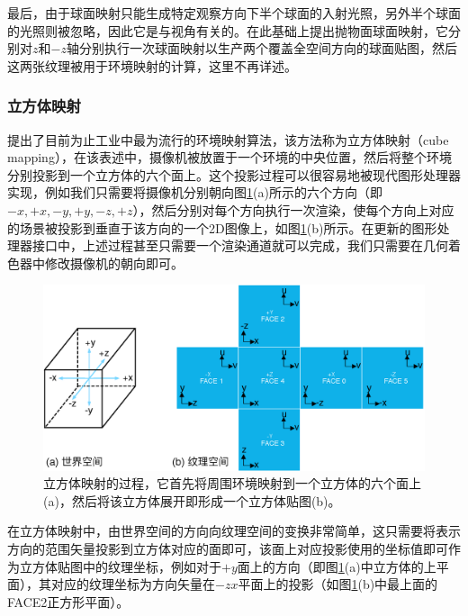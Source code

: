 最后，由于球面映射只能生成特定观察方向下半个球面的入射光照，另外半个球面的光照则被忽略，因此它是与视角有关的。\cite{a:View-independentenvironmentmaps}在此基础上提出抛物面球面映射，它分别对$z$和$-z$轴分别执行一次球面映射以生产两个覆盖全空间方向的球面贴图，然后这两张纹理被用于环境映射的计算，这里不再详述。



\subsubsection{立方体映射}
\cite{a:EnvironmentMappingandOtherApplicationsofWorldProjections}提出了目前为止工业中最为流行的环境映射算法，该方法称为立方体映射（cube mapping），在该表述中，摄像机被放置于一个环境的中央位置，然后将整个环境分别投影到一个立方体的六个面上。这个投影过程可以很容易地被现代图形处理器实现，例如我们只需要将摄像机分别朝向图\ref{f:pl-cube-mapping}(a)所示的六个方向（即$-x,+x,-y,+y,-z,+z$），然后分别对每个方向执行一次渲染，使每个方向上对应的场景被投影到垂直于该方向的一个2D图像上，如图\ref{f:pl-cube-mapping}(b)所示。在更新的图形处理器接口中，上述过程甚至只需要一个渲染通道就可以完成，我们只需要在几何着色器中修改摄像机的朝向即可。

\begin{figure}
	\includegraphics[width=\textwidth]{figures/pl/cube-mapping}
	\caption{立方体映射的过程，它首先将周围环境映射到一个立方体的六个面上(a)，然后将该立方体展开即形成一个立方体贴图(b)。}
	\label{f:pl-cube-mapping}
\end{figure}

在立方体映射中，由世界空间的方向向纹理空间的变换非常简单，这只需要将表示方向的范围矢量投影到立方体对应的面即可，该面上对应投影使用的坐标值即可作为立方体贴图中的纹理坐标，例如对于$+y$面上的方向（即图\ref{f:pl-cube-mapping}(a)中立方体的上平面），其对应的纹理坐标为方向矢量在$-zx$平面上的投影（如图\ref{f:pl-cube-mapping}(b)中最上面的FACE2正方形平面）。

